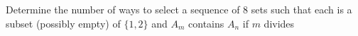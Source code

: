Determine the number of ways to select a sequence of $ 8$ sets  such that each is a subset (possibly empty) of $ \{1,2\}$ and $ A_m$ contains $ A_n$ if $ m$ divides 